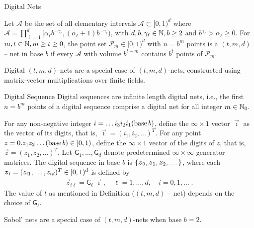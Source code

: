 \documentclass[handout, 10pt,compress,xcolor={usenames,dvipsnames}]{beamer} %
\begin{document}
\begin{frame}{Digital Nets}
	\vspace{-1ex}
\begin{Definition}[$(t, m, d)$ -- net]
	\label{defn:tmd_net}
	Let $\mathcal{A}$ be the set of all elementary intervals $\mathcal{A} \subset [0, 1)^d$ where
	$\mathcal{A} = \prod_{\ell=1}^d [\alpha_\ell b^{-\gamma_\ell} , (\alpha_\ell + 1) b^{-\gamma_\ell})$, 
	with $d,b,\gamma_\ell \in \mathbb{N}, b \ge 2$ 
	and $b^{\gamma_\ell}
	> \alpha_\ell \ge 0$. For $m,t \in \mathbb{N}, m \ge t \ge 0$, the point set $\mathcal{P}_m \in [0, 1)^d$ with $n = b^m$ points is a $(t, m, d)$ -- net in base $b$ if every $\mathcal{A}$ with volume $b^{t-m}$ contains $b^t$ points of $\mathcal{P}_m$.
\end{Definition}	

Digital $(t,m, d)$-nets are a special case of $(t,m, d)$-nets, constructed using matrix-vector multiplications over finite fields. 

\end{frame}



\begin{frame}{Digital Sequence}
	\vspace{-4ex}
Digital sequences are infinite length digital nets, i.e., the first $n=b^m$ points of a digital sequence comprise a digital net for all integer $m \in \mathbb{N}_0$.

	\begin{Definition}%
		For any non-negative integer $i = \dots i_3 i_2 i_1(\textup{base} \, b)$, define the $\infty \times 1$ vector $\vec{\imath}$ as the vector of its digits, that is, $\vec{\imath} = (i_1, i_2, \dots)^T$. 
		For any point $z = 0.z_1 z_2 \dots (\textup{base}\, b) \in [0, 1)$, define the $\infty \times 1$ vector of the digits of $z$, that is, $\vec{z} = (z_1, z_2, \dots)^T$. 
		Let $ \mathsf{G}_1, \dots , \mathsf{G}_d$ denote predetermined $\infty \times \infty$ generator matrices. 
		The digital sequence in \textup{base} $b$ is $\{\boldsymbol{z}_0, \boldsymbol{z}_1, \boldsymbol{z}_2, \dots\}$, where each $\boldsymbol{z}_i = ( z_{i1}, \dots , z_{id})^T \in [0, 1)^d$ is defined by
		\vspace{-1ex}
		\begin{align*}
		\vec{z}_{i\ell} = \mathsf{G}_{\ell} \, \vec{\imath}, \quad \ell = 1, \dots, d, \quad i = 0, 1, \dots \;.
		\end{align*}
		\vspace{-1ex}
		The value of $t$ as mentioned in Definition ($(t, m, d)$ -- net) depends on the choice of $\mathsf{G}_{\ell}$.
	\end{Definition}
	
	Sobol' nets \cite{Sob76} are a special case of $(t,m, d)$-nets when base $b=2$. 
\end{frame}
\fi 
\end{document}
